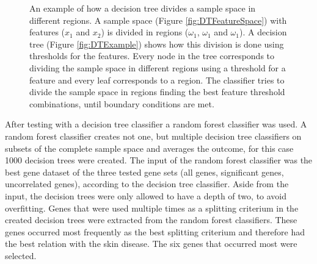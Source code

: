 \documentclass[10pt,a4paper]{article}
\begin{document}
		\begin{figure}[H]
		\centering
		\hfill
		\caption{An example of how a decision tree divides a sample space in different regions. A sample space (Figure \ref{fig:DTFeatureSpace}) with features ($x_1$ and $x_2$) is divided in regions ($\omega_1$, $\omega_1$ and $\omega_1$). A decision tree (Figure \ref{fig:DTExample}) shows how this division is done using thresholds for the features. Every node in the tree corresponds to dividing the sample space in different regions using a threshold for a feature and every leaf corresponds to a region. The classifier tries to divide the sample space in regions finding the best feature threshold combinations, until boundary conditions are met.}
		\label{fig:DecisionTree}
	\end{figure}
	
	After testing with a decision tree classifier a random forest classifier was used. A random forest classifier creates not one, but multiple decision tree classifiers on subsets of the complete sample space and averages the outcome, for this case 1000 decision trees were created. The input of the random forest classifier was the best gene dataset of the three tested gene sets (all genes, significant genes, uncorrelated genes), according to the decision tree classifier. Aside from the input, the decision trees were only allowed to have a depth of two, to avoid overfitting. Genes that were used multiple times as a splitting criterium in the created decision trees were extracted from the random forest classifiers. These genes occurred most frequently as the best splitting criterium and therefore had the best relation with the skin disease. The six genes that occurred most were selected.
	
\end{document}
